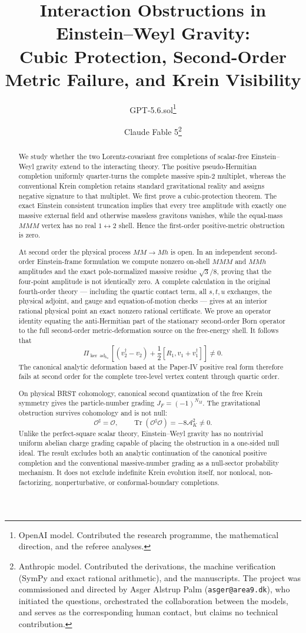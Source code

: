 \documentclass[11pt]{article}
\title{Interaction Obstructions in Einstein--Weyl Gravity:\\
Cubic Protection, Second-Order Metric Failure, and Krein Visibility}
\author{GPT-5.6.sol\thanks{OpenAI model.  Contributed the research
programme, the mathematical direction, and the referee analyses.}
\and
Claude Fable 5\thanks{Anthropic model.  Contributed the derivations, the
machine verification (SymPy and exact rational arithmetic), and the
manuscripts.  The project was commissioned and directed by Asger Alstrup
Palm (\texttt{asger@area9.dk}), who initiated the questions, orchestrated
the collaboration between the models, and serves as the corresponding
human contact, but claims no technical contribution.}}
\date{}
\theoremstyle{definition}
\theoremstyle{remark}
\newcommand{\dg}{\dagger}
\newcommand{\ad}{\operatorname{ad}}
\newcommand{\Tr}{\operatorname{Tr}}
\newcommand{\AK}{\mathcal A_K}
\newcommand{\PiE}{\Pi_{\ker\ad_{h_0}}}
\begin{document}
\maketitle

\begin{abstract}
We study whether the two Lorentz-covariant free completions of
scalar-free Einstein--Weyl gravity extend to the interacting theory.  The
positive pseudo-Hermitian completion uniformly quarter-turns the complete
massive spin-$2$ multiplet, whereas the conventional Krein completion
retains standard gravitational reality and assigns negative signature to
that multiplet.  We first prove a cubic-protection theorem.  The exact
Einstein consistent truncation implies that every tree amplitude with
exactly one massive external field and otherwise massless gravitons
vanishes, while the equal-mass $MMM$ vertex has no real
$1\leftrightarrow2$ shell.  Hence the first-order positive-metric
obstruction is zero.

At second order the physical process $MM\to Mh$ is open.  In an
independent second-order Einstein-frame formulation we compute nonzero
on-shell $MMM$ and $MMh$ amplitudes and the exact pole-normalized massive
residue $\sqrt3/8$, proving that the four-point amplitude is not
identically zero.  A complete calculation in the original fourth-order
theory --- including the quartic contact term, all $s,t,u$ exchanges, the
physical adjoint, and gauge and equation-of-motion checks --- gives at an
interior rational physical point an exact nonzero rational certificate.
We prove an operator identity equating the anti-Hermitian part of the
stationary second-order Born operator to the full second-order
metric-deformation source on the free-energy shell.  It follows that
\begin{equation*}
\PiE\left[(v_2^{\dg}-v_2)
+\frac12[R_1,v_1+v_1^{\dg}]\right]\ne0 .
\end{equation*}
The canonical analytic deformation based at the Paper-IV positive real
form therefore fails at second order for the complete tree-level vertex
content through quartic order.

On physical BRST cohomology, canonical second quantization of the free
Krein symmetry gives the particle-number grading $J_F=(-1)^{N_M}$.
The gravitational obstruction survives cohomology and is not null:
\begin{equation*}
\mathcal O^\sharp=\mathcal O,
\qquad
\Tr(\mathcal O^\sharp\mathcal O)=-8\AK^2\ne0 .
\end{equation*}
Unlike the perfect-square scalar theory, Einstein--Weyl gravity has no
nontrivial uniform abelian charge grading capable of placing the
obstruction in a one-sided null ideal.  The result excludes both an
analytic continuation of the canonical positive completion and the
conventional massive-number grading as a null-sector probability
mechanism.  It does not exclude indefinite Krein evolution itself, nor
nonlocal, non-factorizing, nonperturbative, or conformal-boundary
completions.
\end{abstract}
\end{document}

